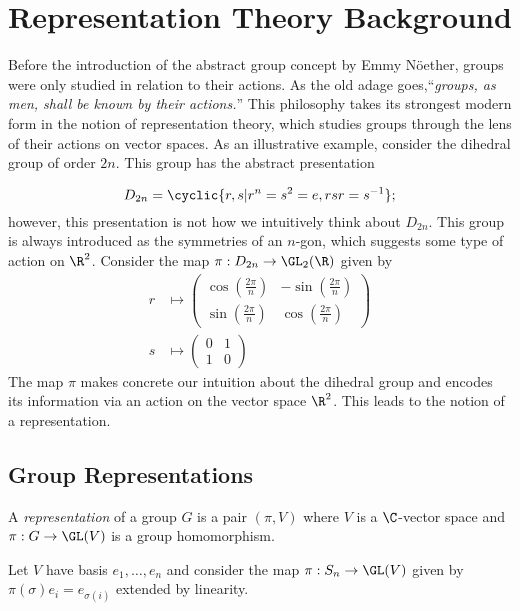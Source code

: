 \documentclass[../main.tex]{subfiles}
\begin{document}
\section{Representation Theory Background}

Before the introduction of the abstract group concept by Emmy N\"{o}ether, groups were only studied in relation to their actions. As the old adage goes,``\textit{groups, as men, shall be known by their actions.}'' This philosophy takes its strongest modern form in the notion of representation theory, which studies groups through the lens of their actions on vector spaces. As an illustrative example, consider the dihedral group of order $ 2n $. This group has the abstract presentation

\[
    D_{2n}=\cyclic{r,s | r^{n}=s^{2}=e, rsr = s^{-1}} ;
\]
however, this presentation is not how we intuitively think about $ D_{2n} $. This group is always introduced as the symmetries of an $ n $-gon, which suggests some type of action on $ \R^{2} $. Consider the map $ \pi:D_{2n}\to \GL_{2}(\R) $ given by 
\begin{align*}
    r&\mapsto \begin{pmatrix}\cos(\frac{2\pi}{n}) &-\sin(\frac{2\pi}{n}) \\\sin(\frac{2\pi}{n}) &\cos(\frac{2\pi}{n})   \end{pmatrix} \\
    s&\mapsto \begin{pmatrix}0 &1 \\1&0 \end{pmatrix}
\end{align*}
The map $ \pi $ makes concrete our intuition about the dihedral group and encodes its information via an action on the vector space $ \R^{2} $. This leads to the notion of a representation.
\subsection{Group Representations}


\begin{definition}
    A \textit{representation} of a group $ G $ is a pair $ (\pi, V) $ where $ V $ is a $ \C $-vector space and $ \pi: G\to \GL(V) $ is a group homomorphism.
\end{definition}


\begin{example}
  Let $ V $ have basis $ e_{1},\ldots, e_{n} $ and consider the map $ \pi:S_{n}\to \GL(V) $ given by $ \pi(\sigma)e_{i} = e_{\sigma(i)} $ extended by linearity. 
\end{example}
\end{document}
